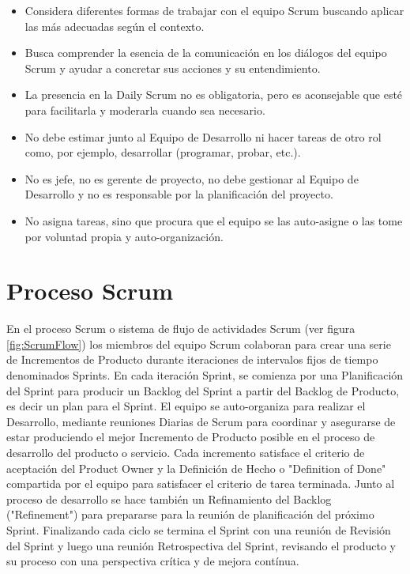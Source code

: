 \begin{itemize}
\item Considera diferentes formas de trabajar con el equipo Scrum buscando aplicar las más adecuadas según el contexto.
\item Busca comprender la esencia de la comunicación en los diálogos del equipo Scrum y ayudar a concretar sus acciones y su entendimiento.
\item La presencia en la Daily Scrum no es obligatoria, pero es aconsejable que esté para facilitarla y moderarla cuando sea necesario.
\item No debe estimar junto al Equipo de Desarrollo ni hacer tareas de otro rol como, por ejemplo, desarrollar (programar, probar, etc.).
\item No es jefe, no es gerente de proyecto, no debe gestionar al Equipo de Desarrollo y no es responsable por la planificación del proyecto.
\item No asigna tareas, sino que procura que el equipo se las auto-asigne o las tome por voluntad propia y auto-organización.
\end{itemize}


\section{Proceso Scrum}

En el proceso Scrum o sistema de flujo de actividades Scrum (ver figura \ref{fig:ScrumFlow}) los miembros del equipo Scrum colaboran para crear una serie de Incrementos de Producto durante iteraciones de intervalos fijos de tiempo denominados Sprints. En cada iteración Sprint, se comienza por una Planificación del Sprint para producir un Backlog del Sprint a partir del Backlog de Producto, es decir un plan para el Sprint. El equipo se auto-organiza para realizar el Desarrollo, mediante reuniones Diarias de Scrum para coordinar y asegurarse de estar produciendo el mejor Incremento de Producto posible en el proceso de desarrollo del producto o servicio. Cada incremento satisface el criterio de aceptación del Product Owner y la Definición de Hecho o "Definition of Done" compartida por el equipo para satisfacer el criterio de tarea terminada. Junto al proceso de desarrollo se hace también un Refinamiento del Backlog ("Refinement") para prepararse para la reunión de planificación del próximo Sprint. Finalizando cada ciclo se termina el Sprint con una reunión de Revisión del Sprint y luego una reunión Retrospectiva del Sprint, revisando el producto y su proceso con una perspectiva crítica y de mejora contínua. 

